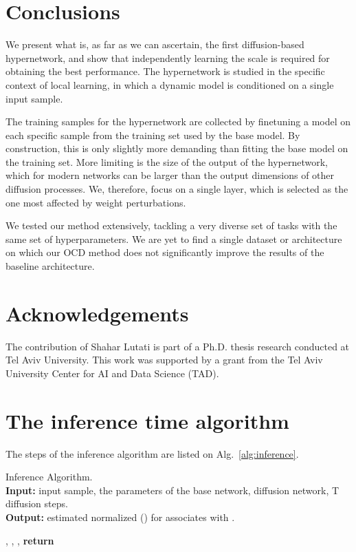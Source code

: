 \documentclass{article}
\theoremstyle{plain}
\begin{document}
\section{Conclusions}

We present what is, as far as we can ascertain, the first diffusion-based hypernetwork, and show that independently learning the scale is required for obtaining the best performance. The hypernetwork is studied in the specific context of local learning, in which a dynamic model is conditioned on a single input sample. 

The training samples for the hypernetwork are collected by finetuning a model on each specific sample from the training set used by the base model. By construction, this is only slightly more demanding than fitting the base model on the training set. More limiting is the size of the output of the hypernetwork, which for modern networks can be larger than the output dimensions of other diffusion processes. We, therefore, focus on a single layer, which is selected as the one most affected by weight perturbations. 

We tested our method extensively, tackling a very diverse set of tasks with the same set of hyperparameters. We are yet to find a single dataset or architecture on which our OCD method does not significantly improve the results of the baseline architecture.  

\section*{Acknowledgements}
The contribution of Shahar Lutati is part of a Ph.D. thesis
research conducted at Tel Aviv University.
This work was supported by a grant from the Tel Aviv University Center for AI and Data Science (TAD).






\appendix
\newpage


\section{The inference time algorithm}
\label{app:alg2}
The steps of the inference algorithm are listed on Alg.~\ref{alg:inference}.

\begin{algorithm}[ht]
\caption{Inference Algorithm. \\ \textbf{Input:}  input sample,   the parameters of the base network,  diffusion network, T  diffusion steps.\\
\textbf{Output:}  estimated normalized () for  associates with .}
\label{alg:inference}
\begin{algorithmic}[1]
\STATE 
\STATE 
\WHILE{} \label{lst:line:overfitting}
\STATE , , , 
    \STATE 
\STATE 
\ENDWHILE\label{overfitting_while}
\STATE \textbf{return} \end{algorithmic}
\end{algorithm}
\end{document}
